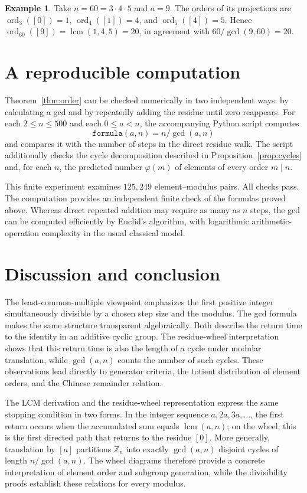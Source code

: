 \documentclass[11pt,a4paper]{article}
\theoremstyle{definition}
\newtheorem{example}[theorem]{Example}
\theoremstyle{remark}
\DeclareMathOperator{\ord}{ord}
\DeclareMathOperator{\lcm}{lcm}
\begin{document}
\begin{example}
Take $n=60=3\cdot4\cdot5$ and $a=9$. The orders of its projections are $\ord_3([0])=1$, $\ord_4([1])=4$, and $\ord_5([4])=5$. Hence $\ord_{60}([9])=\lcm(1,4,5)=20$, in agreement with $60/\gcd(9,60)=20$.
\end{example}

\section{A reproducible computation}
Theorem~\ref{thm:order} can be checked numerically in two independent ways: by calculating a gcd and by repeatedly adding the residue until zero reappears. For each $2\le n\le500$ and each $0\le a<n$, the accompanying Python script computes
\[
\texttt{formula}(a,n)=n/\gcd(a,n)
\]
and compares it with the number of steps in the direct residue walk. The script additionally checks the cycle decomposition described in Proposition~\ref{prop:cycles} and, for each $n$, the predicted number $\varphi(m)$ of elements of every order $m\mid n$.

This finite experiment examines $125{,}249$ element--modulus pairs. All checks pass. The computation provides an independent finite check of the formulas proved above. Whereas direct repeated addition may require as many as $n$ steps, the gcd can be computed efficiently by Euclid's algorithm, with logarithmic arithmetic-operation complexity in the usual classical model.

\section{Discussion and conclusion}
The least-common-multiple viewpoint emphasizes the first positive integer simultaneously divisible by a chosen step size and the modulus. The gcd formula makes the same structure transparent algebraically. Both describe the return time to the identity in an additive cyclic group. The residue-wheel interpretation shows that this return time is also the length of a cycle under modular translation, while $\gcd(a,n)$ counts the number of such cycles. These observations lead directly to generator criteria, the totient distribution of element orders, and the Chinese remainder relation.

The LCM derivation and the residue-wheel representation express the same stopping condition in two forms. In the integer sequence $a,2a,3a,\ldots$, the first return occurs when the accumulated sum equals $\lcm(a,n)$; on the wheel, this is the first directed path that returns to the residue $[0]$. More generally, translation by $[a]$ partitions $\mathbb Z_n$ into exactly $\gcd(a,n)$ disjoint cycles of length $n/\gcd(a,n)$. The wheel diagrams therefore provide a concrete interpretation of element order and subgroup generation, while the divisibility proofs establish these relations for every modulus.
\end{document}
